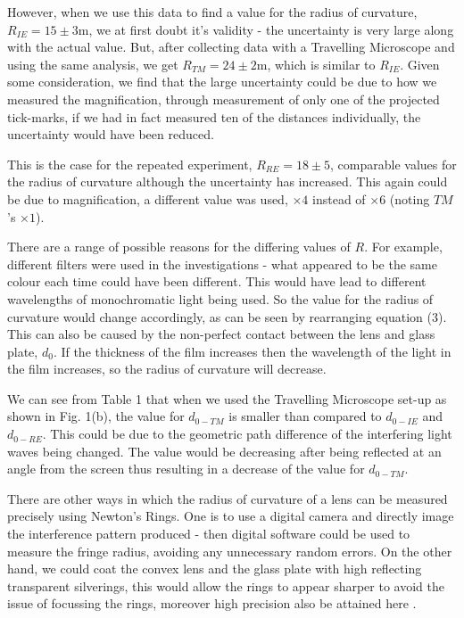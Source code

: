 \documentclass[twocolumn]{revtex4}
\begin{document}
However, when we use this data to find a value for the radius of curvature, $R_{IE}=15\pm3$m, we at first doubt it's validity - the uncertainty is very large along with the actual value. But, after collecting data with a Travelling Microscope and using the same analysis, we get $R_{TM}=24\pm2$m, which is similar to $R_{IE}$. Given some consideration, we find that the large uncertainty could be due to how we measured the magnification, through measurement of only one of the projected tick-marks, if we had in fact measured ten of the distances individually, the uncertainty would have been reduced. 

\vspace{-0.5ex}

This is the case for the repeated experiment, $R_{RE}=18\pm5$, comparable values for the radius of curvature although the uncertainty has increased. This again could be due to magnification, a different value was used, $\times4$ instead of $\times6$ (noting $TM$'s $\times1$). 

There are a range of possible reasons for the differing values of $R$. For example, different filters were used in the investigations - what appeared to be the same colour each time could have been different. This would have lead to different wavelengths of monochromatic light being used. So the value for the radius of curvature would change accordingly, as can be seen by rearranging equation (3). This can also be caused by the non-perfect contact between the lens and glass plate, $d_0$. If the thickness of the film increases then the wavelength of the light in the film increases, so the radius of curvature will decrease.

We can see from Table 1 that when we used the Travelling Microscope set-up as shown in Fig. 1(b), the value for $d_{0-TM}$ is smaller than compared to $d_{0-IE}$ and $d_{0-RE}$. This could be due to the geometric path difference of the interfering light waves being changed. The value would be decreasing after being reflected at an angle from the screen thus resulting in a decrease of the value for $d_{0-TM}$. 

There are other ways in which the radius of curvature of a lens can be measured precisely using Newton's Rings. One is to use a digital camera and directly image the interference pattern produced - then digital software could be used to measure the fringe radius, avoiding any unnecessary random errors. On the other hand, we could coat the convex lens and the glass plate with high reflecting transparent silverings, this would allow the rings to appear sharper to avoid the issue of focussing the rings, moreover high precision also be attained here \cite{manchester}.
\end{document}
